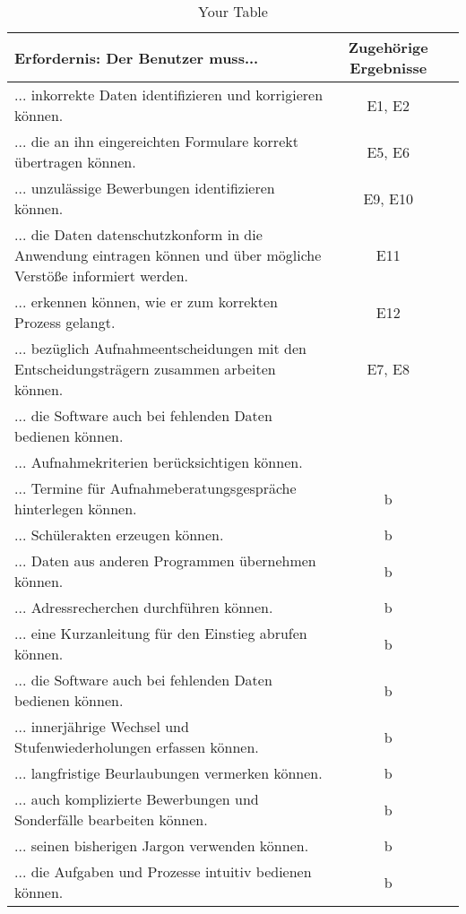 \begin{landscape}

    \begin{longtable}{p{15cm}cc}
        \caption{Your Table} \label{tab:mytable} \\
        \toprule
        Erfordernis: Der Benutzer muss... & Zugehörige Ergebnisse \\
        \midrule
            ... inkorrekte Daten identifizieren und korrigieren können. & E1, E2 \\
            ... die an ihn eingereichten Formulare korrekt übertragen können. & E5, E6 \\
            ... unzulässige Bewerbungen identifizieren können. & E9, E10 \\
            ... die Daten datenschutzkonform in die Anwendung eintragen können und über mögliche Verstöße informiert werden. & E11 \\
            ... erkennen können, wie er zum korrekten Prozess gelangt. & E12 \\
            ... bezüglich Aufnahmeentscheidungen mit den Entscheidungsträgern zusammen arbeiten können. & E7, E8 \\
            ... die Software auch bei fehlenden Daten bedienen können.  & \\
            ... Aufnahmekriterien berücksichtigen können. & \\
            ... Termine für Aufnahmeberatungsgespräche hinterlegen können. & b \\
            ... Schülerakten erzeugen können. & b \\
            ... Daten aus anderen Programmen übernehmen können. & b \\
            ... Adressrecherchen durchführen können. & b \\
            ... eine Kurzanleitung für den Einstieg abrufen können. & b \\
            ... die Software auch bei fehlenden Daten bedienen können. & b \\
            ... innerjährige Wechsel und Stufenwiederholungen erfassen können. & b \\
            ... langfristige Beurlaubungen vermerken können. & b \\
            ... auch komplizierte Bewerbungen und Sonderfälle bearbeiten können. & b \\
            ... seinen bisherigen Jargon verwenden können. & b \\
            ... die Aufgaben und Prozesse intuitiv bedienen können. & b \\

\end{longtable}
\end{landscape}
